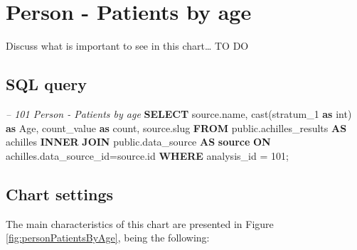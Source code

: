 \documentclass[]{book}
\newenvironment{Shaded}{\begin{snugshade}}{\end{snugshade}}
\newcommand{\KeywordTok}[1]{\textcolor[rgb]{0.13,0.29,0.53}{\textbf{#1}}}
\newcommand{\DataTypeTok}[1]{\textcolor[rgb]{0.13,0.29,0.53}{#1}}
\newcommand{\DecValTok}[1]{\textcolor[rgb]{0.00,0.00,0.81}{#1}}
\newcommand{\CommentTok}[1]{\textcolor[rgb]{0.56,0.35,0.01}{\textit{#1}}}
\newcommand{\FunctionTok}[1]{\textcolor[rgb]{0.00,0.00,0.00}{#1}}
\newcommand{\NormalTok}[1]{#1}
\begin{document}
\section{Person - Patients by age}\label{person---patients-by-age}

Discuss what is important to see in this chart\ldots{} TO DO

\subsection{SQL query}\label{sql-query-7}

\begin{Shaded}
\begin{Highlighting}[]
\CommentTok{-- 101  Person - Patients by age}
\KeywordTok{SELECT}\NormalTok{ source.name,}
       \FunctionTok{cast}\NormalTok{(stratum_1 }\KeywordTok{as} \DataTypeTok{int}\NormalTok{) }\KeywordTok{as}\NormalTok{ Age,}
\NormalTok{       count_value }\KeywordTok{as} \FunctionTok{count}\NormalTok{, }
\NormalTok{       source.slug}
\KeywordTok{FROM}\NormalTok{ public.achilles_results }\KeywordTok{AS}\NormalTok{ achilles }\KeywordTok{INNER} \KeywordTok{JOIN} 
\NormalTok{    public.data_source }\KeywordTok{AS} \KeywordTok{source} \KeywordTok{ON} 
\NormalTok{    achilles.data_source_id=source.id}
\KeywordTok{WHERE}\NormalTok{ analysis_id = }\DecValTok{101}\NormalTok{;}
\end{Highlighting}
\end{Shaded}

\subsection{Chart settings}\label{chart-settings-7}

The main characteristics of this chart are presented in Figure
\ref{fig:personPatientsByAge}, being the following:
\end{document}
